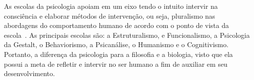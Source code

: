 As escolas da psicologia apoiam em um eixo tendo o intuito intervir na consciência e elaborar métodos de intervenção, ou seja, pluralismo nas abordagens do comportamento humano de acordo com o ponto de vista da escola~\cite{freitas2008historia}.
As principais escolas são: a Estruturalismo, e Funcionalismo, a Psicologia da Gestalt, o Behaviorismo, a Psicanálise, o Humanismo e o Cognitivismo.
Portanto, a diferença da psicologia para a filosofia e a biologia, visto que ela possui a meta de  refletir e intervir no ser humano a fim de auxiliar em seu desenvolvimento.
